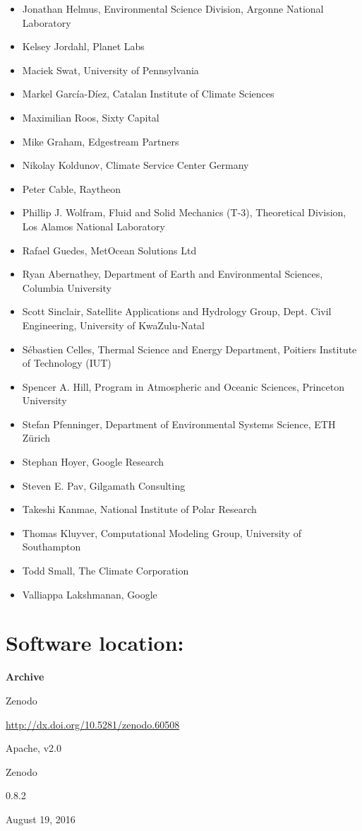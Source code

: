 \documentclass{jors}
\begin{document}
\begin{itemize}
\item Jonathan Helmus, Environmental Science Division, Argonne National Laboratory
\item Kelsey Jordahl, Planet Labs
\item Maciek Swat, University of Pennsylvania
\item Markel García-Díez, Catalan Institute of Climate Sciences
\item Maximilian Roos, Sixty Capital
\item Mike Graham, Edgestream Partners
\item Nikolay Koldunov, Climate Service Center Germany
\item Peter Cable, Raytheon
\item Phillip J. Wolfram, Fluid and Solid Mechanics (T-3), Theoretical Division, Los Alamos National Laboratory
\item Rafael Guedes, MetOcean Solutions Ltd
\item Ryan Abernathey, Department of Earth and Environmental Sciences, Columbia University
\item Scott Sinclair, Satellite Applications and Hydrology Group, Dept. Civil Engineering, University of KwaZulu-Natal
\item Sébastien Celles, Thermal Science and Energy Department, Poitiers Institute of Technology (IUT)
\item Spencer A. Hill, Program in Atmospheric and Oceanic Sciences, Princeton University
\item Stefan Pfenninger, Department of Environmental Systems Science, ETH Zürich
\item Stephan Hoyer, Google Research
\item Steven E. Pav, Gilgamath Consulting
\item Takeshi Kanmae, National Institute of Polar Research
\item Thomas Kluyver, Computational Modeling Group, University of Southampton
\item Todd Small, The Climate Corporation
\item Valliappa Lakshmanan, Google
\end{itemize}

\section*{Software location:}

{\bf Archive}

\begin{description}[noitemsep,topsep=0pt]
	\item[Name:] Zenodo
	\item[Persistent identifier:] \url{http://dx.doi.org/10.5281/zenodo.60508}
	\item[Licence:] Apache, v2.0
	\item[Publisher:]  Zenodo
	\item[Version published:] 0.8.2
	\item[Date published:] August 19, 2016
\end{description}
\end{document}
